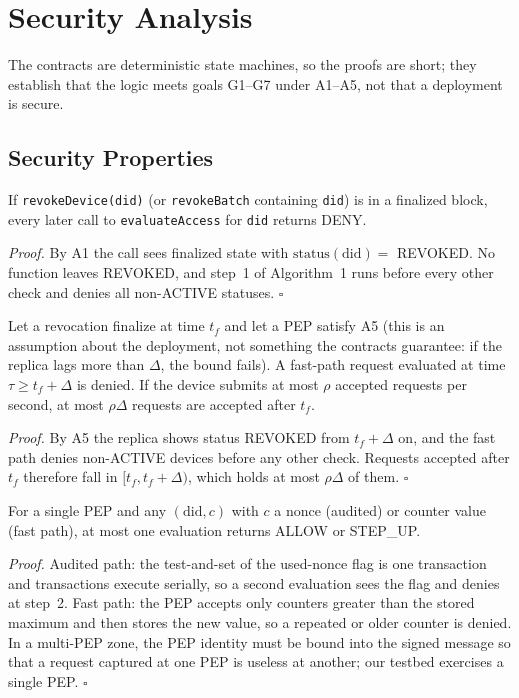 \section{Security Analysis}\label{sec:security}
The contracts are deterministic state machines, so the proofs are short; they establish that the logic meets goals G1--G7 under A1--A5, not that a deployment is secure.

\subsection{Security Properties}\label{sec:props}
\begin{proposition}\label{prop:revoke}
If \texttt{revokeDevice(did)} (or \texttt{revokeBatch} containing \texttt{did}) is in a finalized block, every later call to \texttt{evaluateAccess} for \texttt{did} returns DENY.
\end{proposition}
\emph{Proof.} By A1 the call sees finalized state with $\mathrm{status}(\mathrm{did})=$ REVOKED. No function leaves REVOKED, and step~1 of Algorithm~1 runs before every other check and denies all non-ACTIVE statuses. \hfill$\square$

\begin{proposition}\label{prop:stale}
Let a revocation finalize at time $t_f$ and let a PEP satisfy A5 (this is an assumption about the deployment, not something the contracts guarantee: if the replica lags more than $\Delta$, the bound fails). A fast-path request evaluated at time $\tau\ge t_f+\Delta$ is denied. If the device submits at most $\rho$ accepted requests per second, at most $\rho\Delta$ requests are accepted after $t_f$.
\end{proposition}
\emph{Proof.} By A5 the replica shows status REVOKED from $t_f+\Delta$ on, and the fast path denies non-ACTIVE devices before any other check. Requests accepted after $t_f$ therefore fall in $[t_f,t_f+\Delta)$, which holds at most $\rho\Delta$ of them. \hfill$\square$

\begin{proposition}\label{prop:replay}
For a single PEP and any $(\mathrm{did},c)$ with $c$ a nonce (audited) or counter value (fast path), at most one evaluation returns ALLOW or STEP\_UP.
\end{proposition}
\emph{Proof.} Audited path: the test-and-set of the used-nonce flag is one transaction and transactions execute serially, so a second evaluation sees the flag and denies at step~2. Fast path: the PEP accepts only counters greater than the stored maximum and then stores the new value, so a repeated or older counter is denied. In a multi-PEP zone, the PEP identity must be bound into the signed message so that a request captured at one PEP is useless at another; our testbed exercises a single PEP. \hfill$\square$


